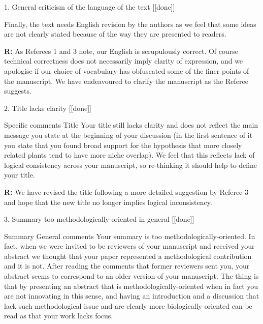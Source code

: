 \documentclass[12pt]{letter}
\newenvironment{refquote}{\bigskip \begin{it}}{\end{it}\smallskip}
\begin{document}
	1. General criticism of the language of the text [[done]]

		\begin{refquote}

		Finally, the text needs English revision by the authors as we feel that some ideas are not clearly stated because of the way they are presented to readers. 

		\end{refquote}


		\textbf{R:} As Referees 1 and 3 note, our English is scrupulously correct. Of course technical correctness does not necessarily imply clarity of expression, and we apologise if our choice of vocabulary has obfuscated some of the finer points of the manuscript. We have endeavoured to clarify the manuscript as the Referee suggests.


	2. Title lacks clarity [[done]]

		\begin{refquote}
		Specific comments
		Title
		Your title still lacks clarity and does not reflect the main message you state at the beginning of your discussion (in the first sentence of it you state that you found broad support for the hypothesis that more closely related plants tend to have more niche overlap). We feel that this reflects lack of logical consistency across your manuscript, so re-thinking it should help to define your title.
		\end{refquote}

		\textbf{R:} We have revised the title following a more detailed suggestion by Referee 3 and hope that the new title no longer implies logical inconsistency.


	3. Summary too methodologically-oriented in general [[done]]

		\begin{refquote}
			Summary
			General comments
			Your summary is too methodologically-oriented. In fact, when we were invited to be reviewers of your manuscript and received your abstract we thought that your paper represented a methodological contribution and it is not. After reading the comments that former reviewers sent you, your abstract seems to correspond to an older version of your manuscript. The thing is that by presenting an abstract that is methodologically-oriented when in fact you are not innovating in this sense, and having an introduction and a discussion that lack such methodological issue and are clearly more biologically-oriented can be read as that your work lacks focus.
		\end{refquote}
\end{document}

